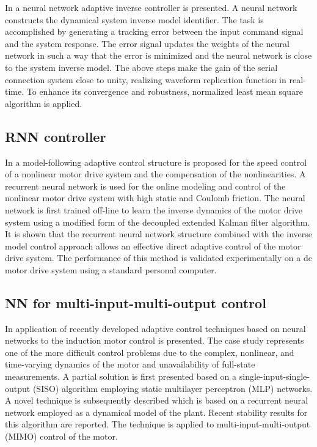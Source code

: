 \documentclass[conference]{IEEEtran}
\begin{document}
In \cite{yao2010adaline} a neural network adaptive inverse controller is presented. A neural network constructs the dynamical system inverse model identifier. The task is accomplished by generating a tracking error between the input command signal and the system response. The error signal updates the weights of the neural network in such a way that the error is minimized and the neural network is close to the system inverse model. The above steps make the gain of the serial connection system close to unity, realizing waveform replication function in real-time. To enhance its convergence and robustness, normalized least mean square algorithm is applied.

\subsection{\textbf{RNN controller}}

In \cite{nouri2008adaptive} a model-following adaptive control structure is proposed for the speed control of a nonlinear motor drive system and the compensation of the nonlinearities. A recurrent neural network is used for the online modeling and control of the nonlinear motor drive system with high static and Coulomb friction. The neural network is first trained off-line to learn the inverse dynamics of the motor drive system using a modified form of the decoupled extended Kalman filter algorithm. It is shown that the recurrent neural network structure combined with the inverse model control approach allows an effective direct adaptive control of the motor drive system. The performance of this method is validated experimentally on a dc motor drive system using a standard personal computer.

\subsection{\textbf{NN for multi-input-multi-output control}}

In \cite{brdys1999dynamic} application of recently developed adaptive control techniques based on neural networks to the induction motor control is presented. The case study represents one of the more difficult control problems due to the complex, nonlinear, and time-varying dynamics of the motor and unavailability of full-state measurements. A partial solution is first presented based on a single-input-single-output (SISO) algorithm employing static multilayer perceptron (MLP) networks. A novel technique is subsequently described which is based on a recurrent neural network employed as a dynamical model of the plant. Recent stability results for this algorithm are reported. The technique is applied to multi-input-multi-output (MIMO) control of the motor.
\end{document}
